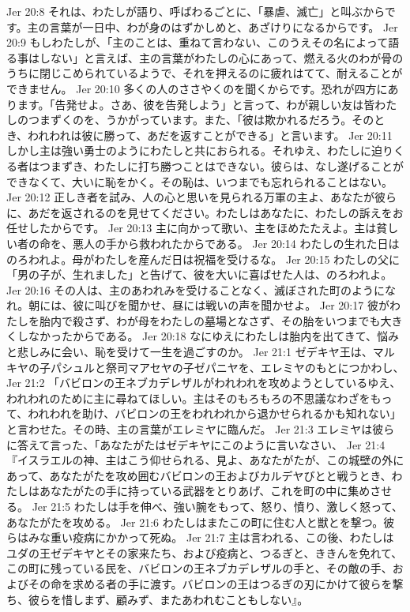 Jer 20:8  それは、わたしが語り、呼ばわるごとに、「暴虐、滅亡」と叫ぶからです。主の言葉が一日中、わが身のはずかしめと、あざけりになるからです。
Jer 20:9  もしわたしが、「主のことは、重ねて言わない、このうえその名によって語る事はしない」と言えば、主の言葉がわたしの心にあって、燃える火のわが骨のうちに閉じこめられているようで、それを押えるのに疲れはてて、耐えることができません。
Jer 20:10  多くの人のささやくのを聞くからです。恐れが四方にあります。「告発せよ。さあ、彼を告発しよう」と言って、わが親しい友は皆わたしのつまずくのを、うかがっています。また、「彼は欺かれるだろう。そのとき、われわれは彼に勝って、あだを返すことができる」と言います。
Jer 20:11  しかし主は強い勇士のようにわたしと共におられる。それゆえ、わたしに迫りくる者はつまずき、わたしに打ち勝つことはできない。彼らは、なし遂げることができなくて、大いに恥をかく。その恥は、いつまでも忘れられることはない。
Jer 20:12  正しき者を試み、人の心と思いを見られる万軍の主よ、あなたが彼らに、あだを返されるのを見せてください。わたしはあなたに、わたしの訴えをお任せしたからです。
Jer 20:13  主に向かって歌い、主をほめたたえよ。主は貧しい者の命を、悪人の手から救われたからである。
Jer 20:14  わたしの生れた日はのろわれよ。母がわたしを産んだ日は祝福を受けるな。
Jer 20:15  わたしの父に「男の子が、生れました」と告げて、彼を大いに喜ばせた人は、のろわれよ。
Jer 20:16  その人は、主のあわれみを受けることなく、滅ぼされた町のようになれ。朝には、彼に叫びを聞かせ、昼には戦いの声を聞かせよ。
Jer 20:17  彼がわたしを胎内で殺さず、わが母をわたしの墓場となさず、その胎をいつまでも大きくしなかったからである。
Jer 20:18  なにゆえにわたしは胎内を出てきて、悩みと悲しみに会い、恥を受けて一生を過ごすのか。
Jer 21:1  ゼデキヤ王は、マルキヤの子パシュルと祭司マアセヤの子ゼパニヤを、エレミヤのもとにつかわし、
Jer 21:2  「バビロンの王ネブカデレザルがわれわれを攻めようとしているゆえ、われわれのために主に尋ねてほしい。主はそのもろもろの不思議なわざをもって、われわれを助け、バビロンの王をわれわれから退かせられるかも知れない」と言わせた。その時、主の言葉がエレミヤに臨んだ。
Jer 21:3  エレミヤは彼らに答えて言った、「あなたがたはゼデキヤにこのように言いなさい、
Jer 21:4  『イスラエルの神、主はこう仰せられる、見よ、あなたがたが、この城壁の外にあって、あなたがたを攻め囲むバビロンの王およびカルデヤびとと戦うとき、わたしはあなたがたの手に持っている武器をとりあげ、これを町の中に集めさせる。
Jer 21:5  わたしは手を伸べ、強い腕をもって、怒り、憤り、激しく怒って、あなたがたを攻める。
Jer 21:6  わたしはまたこの町に住む人と獣とを撃つ。彼らはみな重い疫病にかかって死ぬ。
Jer 21:7  主は言われる、この後、わたしはユダの王ゼデキヤとその家来たち、および疫病と、つるぎと、ききんを免れて、この町に残っている民を、バビロンの王ネブカデレザルの手と、その敵の手、およびその命を求める者の手に渡す。バビロンの王はつるぎの刃にかけて彼らを撃ち、彼らを惜しまず、顧みず、またあわれむこともしない』。
